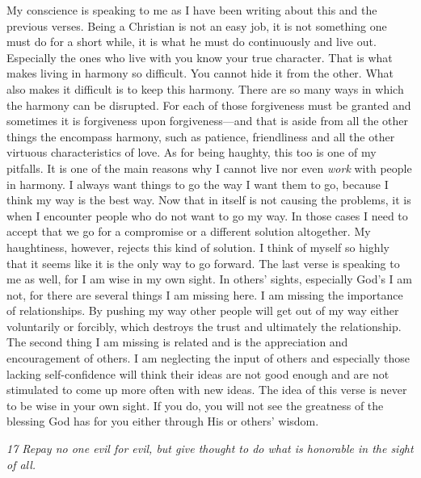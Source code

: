 My conscience is speaking to me as I have been writing about this and
the previous verses. Being a Christian is not an easy job, it is not
something one must do for a short while, it is what he must do
continuously and live out. Especially the ones who live with you know
your true character. That is what makes living in harmony so difficult.
You cannot hide it from the other. What also makes it difficult is to
keep this harmony. There are so many ways in which the harmony can be
disrupted. For each of those forgiveness must be granted and sometimes
it is forgiveness upon forgiveness---and that is aside from all the
other things the encompass harmony, such as patience, friendliness and
all the other virtuous characteristics of love. As for being haughty,
this too is one of my pitfalls. It is one of the main reasons why I
cannot live nor even \emph{work} with people in harmony. I always want
things to go the way I want them to go, because I think my way is the
best way. Now that in itself is not causing the problems, it is when I
encounter people who do not want to go my way. In those cases I need to
accept that we go for a compromise or a different solution altogether.
My haughtiness, however, rejects this kind of solution. I think of
myself so highly that it seems like it is the only way to go forward.
The last verse is speaking to me as well, for I am wise in my own sight.
In others' sights, especially God's I am not, for there are several
things I am missing here. I am missing the importance of relationships.
By pushing my way other people will get out of my way either voluntarily
or forcibly, which destroys the trust and ultimately the relationship.
The second thing I am missing is related and is the appreciation and
encouragement of others. I am neglecting the input of others and
especially those lacking self-confidence will think their ideas are not
good enough and are not stimulated to come up more often with new ideas.
The idea of this verse is never to be wise in your own sight. If you do,
you will not see the greatness of the blessing God has for you either
through His or others' wisdom.

\emph{17 Repay no one evil for evil, but give thought to do what is
honorable in the sight of all.}

